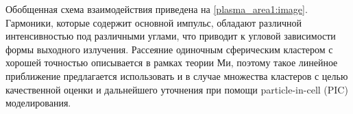 Обобщенная схема взаимодействия приведена на \autoref{plasma_area1:image}. Гармоники, которые содержит основной импульс, обладают различной интенсивностью под различными углами, что приводит к угловой зависимости формы выходного излучения. Рассеяние одиночным сферическим кластером с хорошей точностью описывается в рамках теории Ми, поэтому такое линейное приближение предлагается использовать и в случае множества кластеров с целью качественной оценки и дальнейшего уточнения при помощи particle-in-cell (PIC) моделирования.

